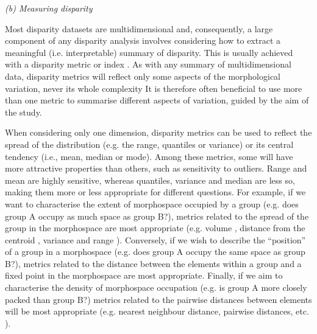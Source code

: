 \documentclass[12pt,letterpaper]{article}
\renewcommand{\subsection}[1]{%
\bigskip
\begin{center}
\begin{large}
\normalfont\itshape #1
\end{large}
\end{center}}
\begin{document}
\subsection{(b) Measuring disparity}

Most disparity datasets are multidimensional and, consequently, a large component of any disparity analysis involves considering how to extract a meaningful (i.e. interpretable) summary of disparity.
This is usually achieved with a disparity metric or index \citep{Hopkins2017-cf}.
As with any summary of multidimensional data, disparity metrics will reflect only some aspects of the morphological variation, never its whole complexity %
It is therefore often beneficial to use more than one metric to summarise different aspects of variation, guided by the aim of the study.

When considering only one dimension, disparity metrics can be used to reflect the spread of the distribution (e.g. the range, quantiles or variance) or its central tendency (i.e., mean, median or mode).
Among these metrics, some will have more attractive properties than others, such as sensitivity to outliers. Range and mean are highly sensitive, whereas quantiles, variance and median are less so, making them more or less appropriate for different questions.
For example, if we want to characterise the extent of morphospace occupied by a group (e.g. does group A occupy as much space as group B?), metrics related to the spread of the group in the morphospace are most appropriate (e.g. volume
\citealt{Diaz2016-mr}, distance from the centroid \citealt{Hopkins2017-cf, Finlay2015-ft}, variance and range \citealt{Brusatte2008-fx}).
Conversely, if we wish to describe the ``position''
 of a group in a morphospace (e.g. does group A occupy the same space as group B?), metrics related to the distance between the elements within a group and a fixed point in the morphospace are most appropriate. %
Finally, if we aim to characterise the density of morphospace occupation (e.g. is group A more closely packed than group B?) metrics related to the pairwise distances between elements will be most appropriate (e.g. nearest neighbour distance, pairwise distances, etc. \citealt{Close2015-qi}).
\end{document}
